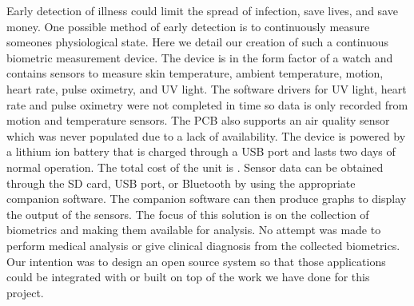 Early detection of illness could limit the spread of infection, save lives, and
save money.  One possible method of early detection is to continuously measure
someones physiological state.  Here we detail our creation of such a continuous
biometric measurement device.  The device is in the form factor of a watch and
contains sensors to measure skin temperature, ambient temperature, motion, 
heart rate, pulse oximetry, and UV light. The software drivers for UV light,
heart rate and pulse oximetry were not completed in time so data is only
recorded from motion and temperature sensors. The PCB also supports an air
quality sensor which was never populated due to a lack of availability.
The device is powered by a lithium ion battery that is charged
through a USB port and lasts two days of normal operation.  
The total cost of the unit is \costofboard.  Sensor data can be
obtained through the SD card, USB port, or Bluetooth by using the appropriate companion
software.  The companion software can then produce graphs to display the output
of the sensors.  The focus of this solution is on the collection of biometrics
and making them available for analysis.  No attempt was made to perform medical
analysis or give clinical diagnosis from the collected biometrics.  Our
intention was to design an open source system so that those applications could be
integrated with or built on top of the work we have done for this project.
